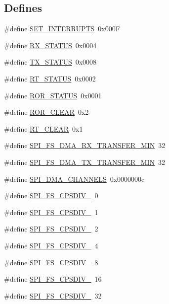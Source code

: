 \subsection*{Defines}
\begin{DoxyCompactItemize}
\item 
\#define \hyperlink{a00589_a0710240ccdbef200879fbec6fde50342}{SET\_\-INTERRUPTS}~0x000F
\item 
\#define \hyperlink{a00589_a731d30ee0b5f9f0471fa8e742ef1784c}{RX\_\-STATUS}~0x0004
\item 
\#define \hyperlink{a00589_a7575bf922b1b02fa694d964bb94e1a29}{TX\_\-STATUS}~0x0008
\item 
\#define \hyperlink{a00589_a202d8710d0c6930b5c266948f5712d7a}{RT\_\-STATUS}~0x0002
\item 
\#define \hyperlink{a00589_a2b4dc619ceaead61fe74bbcf490dc15b}{ROR\_\-STATUS}~0x0001
\item 
\#define \hyperlink{a00589_a24c449323e2955bc782cdf3b34de1e33}{ROR\_\-CLEAR}~0x2
\item 
\#define \hyperlink{a00589_aa4b1a0a251c6fac18230a25d8d89388c}{RT\_\-CLEAR}~0x1
\item 
\#define \hyperlink{a00589_a456af18dd9366483ff3b07327d577f26}{SPI\_\-FS\_\-DMA\_\-RX\_\-TRANSFER\_\-MIN}~32
\item 
\#define \hyperlink{a00589_a27d15d7727545ed47bce0008104baf32}{SPI\_\-FS\_\-DMA\_\-TX\_\-TRANSFER\_\-MIN}~32
\item 
\#define \hyperlink{a00589_acc862b4e66ca1cd03299556793dc5be3}{SPI\_\-DMA\_\-CHANNELS}~0x0000000c
\item 
\#define \hyperlink{a00589_a2c2f57ccb3384cbbd16b7560eabe97e6}{SPI\_\-FS\_\-CPSDIV\_}~0
\item 
\#define \hyperlink{a00589_ad6d79a50da87314c1989cd7f39701ad5}{SPI\_\-FS\_\-CPSDIV\_}~1
\item 
\#define \hyperlink{a00589_ae4e038e7a7b87dff529ef6528cc2d311}{SPI\_\-FS\_\-CPSDIV\_}~2
\item 
\#define \hyperlink{a00589_ac646e8f734ae29267f935a5faab2cc88}{SPI\_\-FS\_\-CPSDIV\_}~4
\item 
\#define \hyperlink{a00589_abb446162a3c6f1ccf7068fd7d309d463}{SPI\_\-FS\_\-CPSDIV\_}~8
\item 
\#define \hyperlink{a00589_a493a9b8d2f1cdfbb226dbeada0c41515}{SPI\_\-FS\_\-CPSDIV\_}~16
\item 
\#define \hyperlink{a00589_ade855284438c3a7b00872b86afeb2a42}{SPI\_\-FS\_\-CPSDIV\_}~32
\item 

\end{DoxyCompactItemize}
